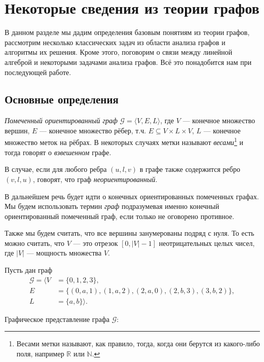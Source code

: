 \chapter{Некоторые сведения из теории графов}\label{chpt:GraphTheoryIntro}

В данном разделе мы дадим определения базовым понятиям из теории графов, рассмотрим несколько классических задач из области анализа графов и алгоритмы их решения.
Кроме этого, поговорим о связи между линейной алгеброй и некоторыми задачами анализа графов.
Всё это понадобится нам при последующей работе.

\section{Основные определения}

\begin{definition}
  \textit{Помеченный ориентированный граф} $\mathcal{G} = \langle V, E, L \rangle$, где $V$ --- конечное множество вершин, $E$ --- конечное множество рёбер, т.ч. $E \subseteq V \times L \times V$, $L$ --- конечное множество меток на рёбрах. В некоторых случаях метки называют \textit{весами}\footnote{Весами метки называют, как правило, тогда, когда они берутся из какого-либо поля, например $\mathbb{R}$ или $\mathbb{N}$.} и тогда говорят о \textit{взвешенном} графе.
\end{definition}


\begin{definition}
  В случае, если для любого ребра $(u,l,v)$ в графе также содержится ребро $(v,l,u)$, говорят, что граф \textit{неориентированный}.
\end{definition}


В дальнейшем речь будет идти о конечных ориентированных помеченных графах.
Мы будем использовать термин \textit{граф} подразумевая именно конечный ориентированный помеченный граф, если только не оговорено противное.

Также мы будем считать, что все вершины занумерованы подряд с нуля.
То есть можно считать, что $V$ --- это отрезок $[0, |V| - 1]$ неотрицательных целых чисел, где $|V|$ --- мощность множества $V$.

\begin{example}
  Пусть дан граф
  \begin{align*}
    \mathcal{G} = \langle V&=\{0,1,2,3\},\\
                            E&=\{(0,a,1), (1,a,2), (2,a,0), (2,b,3), (3,b,2)\}, \\
                            L&=\{a,b\} \rangle.
  \end{align*}

  Графическое представление графа $\mathcal{G}$:
  \begin{center}
  
  \end{center}
\end{example}

